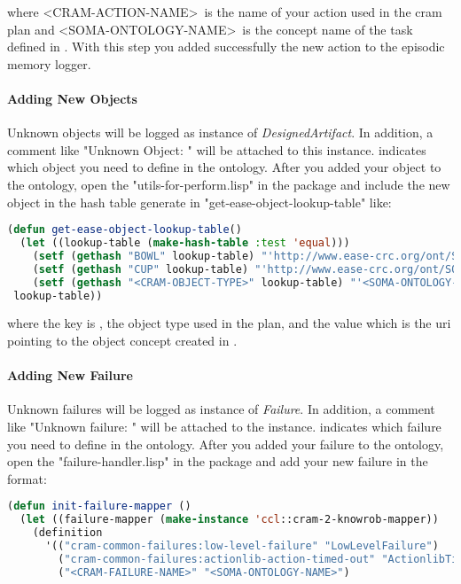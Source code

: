 where \textless CRAM-ACTION-NAME\textgreater~is the name of your action used in the cram plan and \textless SOMA-ONTOLOGY-NAME\textgreater~is the concept name of the task defined in \soma. 
With this step you added successfully the new action to the \cram \neem episodic memory logger.

\paragraph{Adding New Objects}
Unknown objects will be logged as instance of \textit{DesignedArtifact}.
In addition, a comment like "Unknown Object: " will be attached to this instance.
 indicates which object you need to define in the \soma ontology.
After you added your object to the ontology, open the "utils-for-perform.lisp" in the \cramloggerpackage package and include the new object in the hash table generate in "get-ease-object-lookup-table" like:

\begin{lstlisting}[language=lisp, caption=Linking the CRAM Object to the Ontology Concept]
(defun get-ease-object-lookup-table()
  (let ((lookup-table (make-hash-table :test 'equal)))
    (setf (gethash "BOWL" lookup-table) "'http://www.ease-crc.org/ont/SOMA.owl#Bowl'")
    (setf (gethash "CUP" lookup-table) "'http://www.ease-crc.org/ont/SOMA.owl#Cup'")
    (setf (gethash "<CRAM-OBJECT-TYPE>" lookup-table) "'<SOMA-ONTOLOGY-ENTITY-IRI>'")
 lookup-table))
\end{lstlisting}

where the key is , the object type used in the \cram plan, and the value which is the uri pointing to the object concept created in \soma.

\paragraph{Adding New Failure}
Unknown \cram failures will be logged as instance of \textit{Failure}.
In addition, a comment like "Unknown failure: " will be attached to the instance.
 indicates which failure you need to define in the ontology.
After you added your failure to the ontology, open the "failure-handler.lisp" in the \cramloggerpackage package and add your new failure in the format:

\begin{lstlisting}[language=lisp, caption=Linking the CRAM Action to the Ontology Concept]
(defun init-failure-mapper ()
  (let ((failure-mapper (make-instance 'ccl::cram-2-knowrob-mapper))
    (definition
      '(("cram-common-failures:low-level-failure" "LowLevelFailure")
        ("cram-common-failures:actionlib-action-timed-out" "ActionlibTimeout")
        ("<CRAM-FAILURE-NAME>" "<SOMA-ONTOLOGY-NAME>")
\end{lstlisting}

